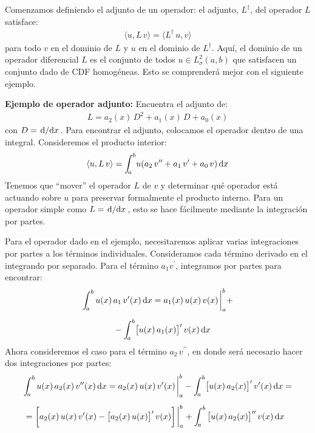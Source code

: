 \documentclass[12pt]{article}
\newcommand{\pderivada}[1]{\ensuremath{{#1}^{\prime}}}
\newcommand{\sderivada}[1]{\ensuremath{{#1}^{\prime \prime}}}
\def\scaleint#1{\vcenter{\hbox{\scaleto[3ex]{\displaystyle\int}{#1}}}}
\def\bs{\mkern-12mu}
\numberwithin{equation}{section}
\begin{document}
Comenzamos definiendo el adjunto de un operador:  el adjunto, $L^{\dagger}$, del operador $L$ satisface:
\begin{align*}
\langle u, L \, v \rangle = \langle L^{\dagger} \, u,  v \rangle
\end{align*}
para todo $v$ en el dominio de $L$ y $u$ en el dominio de $L^{\dagger}$. Aquí, el dominio de un operador diferencial $L$ es el conjunto de todos $u \in L_{\sigma}^{2} (a, b)$ que satisfacen un conjunto dado de CDF homogéneas. Esto se comprenderá mejor con el siguiente ejemplo.
\par
\noindent
\textbf{Ejemplo de operador adjunto: } Encuentra el adjunto de:
\begin{align*}
L = a_{2}(x) \, D^{2} + a_{1}(x) \, D + a_{0}(x)
\end{align*}
con $D = \dv*{x}$.
Para encontrar el adjunto, colocamos el operador dentro de una integral. Consideremos el producto interior:
\begin{align*}
\langle u , L \, v \rangle = \scaleint{5ex}_{\bs a}^{b} u (a_{2} \, \sderivada{v} + a_{1} \, \pderivada{v} + a_{0} \, v) \dd{x}
\end{align*}
Tenemos que \enquote{mover} el operador $L$ de $v$  y determinar qué operador está actuando sobre $u$ para preservar formalmente el producto interno. Para un operador simple como $L = \dv*{x}$, esto se hace fácilmente mediante la integración por partes.
\par
Para el operador dado en el ejemplo, necesitaremos aplicar varias integraciones por partes a los términos individuales. Consideramos cada término derivado en el integrando por separado. Para el término $a_{1} \pderivada{v}$, integramos por partes para encontrar:
\begin{eqnarray}
\begin{aligned}[b]
\scaleint{5ex}_{\bs a}^{b} \, u(x) \, &a_{1} \, \pderivada{v}(x) \dd{x} = a_{1}(x) \, u(x) \, v(x) \eval_{a}^{b} + \\[0.5em]
&- \scaleint{5ex}_{\bs a}^{b} \big[ u(x) \, a_{1} (x) \big]^{\prime} \, v(x) \dd{x}
\end{aligned}
\label{eq:ecuacion_04_17}
\end{eqnarray}
Ahora consideremos el caso para el término $a_{2} \, \sderivada{v}$, en donde será necesario hacer dos integraciones por partes:
\begin{eqnarray}
\begin{aligned}[b]
&\scaleint{5ex}_{\bs a}^{b} \, u(x) \, a_{2} (x) \, \sderivada{v}(x) \dd{x} = a_{2}(x) \, u(x) \, \pderivada{v}(x) \eval_{a}^{b} - \scaleint{5ex}_{\bs a}^{b} \big[ u(x) \, a_{2} (x) \big]^{\prime} \, \pderivada{v}(x) \dd{x} = \\[0.5em]
&= \bigg[ a_{2}(x) \, u(x) \, \pderivada{v}(x) - \big[ a_{2}(x) \, u(x) \big]^{\prime} \, v(x) \bigg] \eval_{a}^{b} + \scaleint{5ex}_{\bs a}^{b} \, \big[ u(x) \, a_{2} (x) \big]^{\prime \prime} \, v(x) \dd{x}
\end{aligned}
\label{eq:ecuacion_04_18}
\end{eqnarray}
\end{document}
